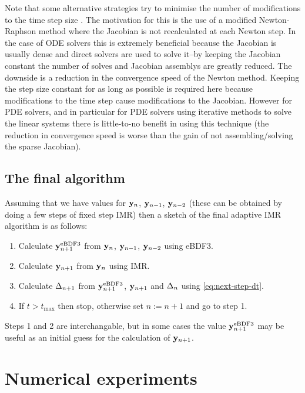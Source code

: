 Note that some alternative strategies try to minimise the number of modifications to the time step size \cite[chap. 6]{Iserles2009} \cite[Sec. 2.1]{cvode-manual}.
The motivation for this is the use of a modified Newton-Raphson method where the Jacobian is not recalculated at each Newton step.
In the case of ODE solvers this is extremely beneficial because the Jacobian is usually dense and direct solvers are used to solve it--by keeping the Jacobian constant the number of solves and Jacobian assemblys are greatly reduced.
The downside is a reduction in the convergence speed of the Newton method.
Keeping the step size constant for as long as possible is required here because modifications to the time step cause modifications to the Jacobian.
However for PDE solvers, and in particular for PDE solvers using iterative methods to solve the linear systems there is little-to-no benefit in using this technique (the reduction in convergence speed is worse than the gain of not assembling/solving the sparse Jacobian)\cite[128]{Iserles2009}.


\subsection{The final algorithm}

Assuming that we have values for $\mathbf{y}_n$, $\mathbf{y}_{n-1}$, $\mathbf{y}_{n-2}$ (these can be obtained \eg by doing a few steps of fixed step IMR) then a sketch of the final adaptive IMR algorithm is as follows:
\begin{enumerate}
\item Calculate $\mathbf{y}_{n+1}^{\text{eBDF3}}$ from $\mathbf{y}_n$, $\mathbf{y}_{n-1}$, $\mathbf{y}_{n-2}$ using eBDF3.
\item Calculate $\mathbf{y}_{n+1}$ from $\mathbf{y}_n$ using IMR.
\item Calculate $\Delta_{n+1}$ from $\mathbf{y}_{n+1}^{\text{eBDF3}}$, $\mathbf{y}_{n+1}$ and $\Delta_{n}$ using
  \eqref{eq:next-step-dt}.
\item If $t > t_{\text{max}}$ then stop, otherwise set $n := n+1$ and go to step 1.
\end{enumerate}

Steps 1 and 2 are interchangable, but in some cases the value $\mathbf{y}_{n+1}^{\text{eBDF3}}$ may be useful as an initial guess for the calculation of $\mathbf{y}_{n+1}$.


\section{Numerical experiments}
\label{sec:aimr-testing}


